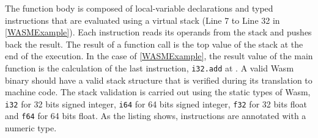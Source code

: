 The function body is composed of local-variable declarations and typed instructions that are evaluated using a virtual stack (Line 7 to Line 32 in \autoref{WASMExample}). Each instruction reads its operands from the stack and pushes back the result. The result of a function call is the top value of the stack at the end of the execution. In the case of \autoref{WASMExample}, the result value of the main function is the calculation of the last instruction, \texttt{i32.add} at . A valid Wasm  binary should have a valid stack structure that is verified during its translation to machine code. The stack validation is carried out using the static types of Wasm, \texttt{i32} for 32 bits signed integer, \texttt{i64} for 64 bits signed integer, \texttt{f32} for 32 bits float and \texttt{f64} for 64 bits float. As the listing shows, instructions are annotated with a numeric type.

\begin{code}
    \begin{minipage}[t]{0.45\linewidth}

\end{minipage}\hspace{10mm}
\begin{minipage}[t]{0.46\linewidth}
%

\end{minipage}






\end{code}

